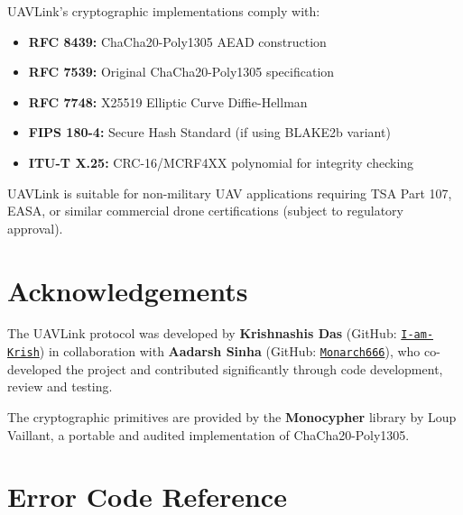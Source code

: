 \documentclass[11pt,a4paper]{article}
\begin{document}
UAVLink's cryptographic implementations comply with:

\begin{itemize}[noitemsep]
    \item \textbf{RFC 8439:} ChaCha20-Poly1305 AEAD construction
    \item \textbf{RFC 7539:} Original ChaCha20-Poly1305 specification
    \item \textbf{RFC 7748:} X25519 Elliptic Curve Diffie-Hellman
    \item \textbf{FIPS 180-4:} Secure Hash Standard (if using BLAKE2b variant)
    \item \textbf{ITU-T X.25:} CRC-16/MCRF4XX polynomial for integrity checking
\end{itemize}

UAVLink is suitable for non-military UAV applications requiring TSA Part 107, EASA, or similar commercial drone certifications (subject to regulatory approval).

\newpage
\section{Acknowledgements}

The UAVLink protocol was developed by \textbf{Krishnashis Das} (GitHub: \href{https://github.com/I-am-Krish}{\texttt{I-am-Krish}}) in collaboration with \textbf{Aadarsh Sinha} (GitHub: \href{https://github.com/Monarch666}{\texttt{Monarch666}}), who co-developed the project and contributed significantly through code development, review and testing.

The cryptographic primitives are provided by the \textbf{Monocypher} library by Loup Vaillant, a portable and audited implementation of ChaCha20-Poly1305.

\newpage
\appendix
\section{Error Code Reference}
\end{document}
